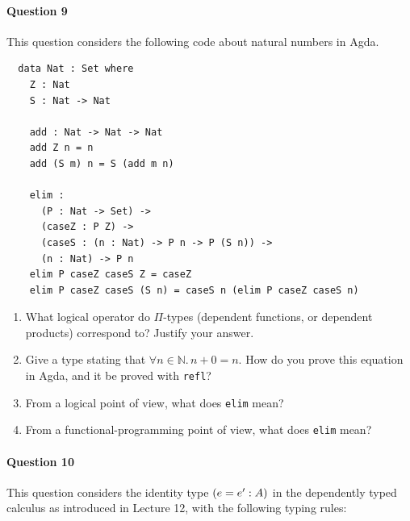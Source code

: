 \documentclass[11pt,a4paper,twoside]{article}
\begin{document}
\paragraph{Question 9} This question considers the following code
about natural numbers in Agda.
\begin{lstlisting}
  data Nat : Set where
    Z : Nat
    S : Nat -> Nat

    add : Nat -> Nat -> Nat
    add Z n = n
    add (S m) n = S (add m n)

    elim :
      (P : Nat -> Set) ->
      (caseZ : P Z) ->
      (caseS : (n : Nat) -> P n -> P (S n)) ->
      (n : Nat) -> P n
    elim P caseZ caseS Z = caseZ
    elim P caseZ caseS (S n) = caseS n (elim P caseZ caseS n)
\end{lstlisting}
\begin{enumerate}[label=(\alph*)]
  \item What logical operator do $\Pi$-types (dependent functions, or
    dependent products) correspond to?
    Justify your answer.

  \item Give a type stating that $\forall n\in \mathbb{N}.\, n + 0 = n$.
    How do you prove this equation in Agda, and it be proved with \texttt{refl}?

  \item From a logical point of view, what does \texttt{elim} mean?

  \item From a functional-programming point of view, what does
    \texttt{elim} mean?
\end{enumerate}

\paragraph{Question 10} This question considers the identity type
$(e = e' : A)$
in the dependently typed calculus as introduced in Lecture 12,
with the following typing rules:
\begin{center}
  \begin{bprooftree}
  \end{bprooftree}
  \
  \begin{bprooftree}
  \end{bprooftree}

  \vspace{1em}

  \begin{bprooftree}
  \end{bprooftree}
\end{center}
\end{document}
